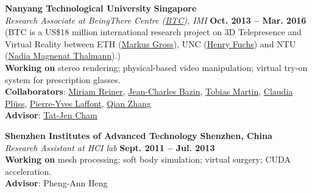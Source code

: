 \documentclass[margin,line]{resume}
\begin{document}
\begin{resume}
    \textbf{Nanyang Technological University} \hfill \textbf{Singapore} \\
    \textsl{Research Associate at BeingThere Centre (\href{https://www.youtube.com/watch?v=Oy-xrxOB_4Q}{BTC}), IMI} \hfill \textbf{Oct. 2013 -- Mar. 2016}\\
    (BTC is a US\$18 million international research project on 3D Telepresence and Virtual Reality between ETH (\href{https://en.wikipedia.org/wiki/Markus_Gross}{Markus Gross}), UNC (\href{https://en.wikipedia.org/wiki/Henry_Fuchs}{Henry Fuchs}) and
    NTU (\href{https://en.wikipedia.org/wiki/Nadia_Magnenat_Thalmann}{Nadia Magnenat Thalmann}).)\\
    \textbf{Working on} stereo rendering; physical-based video manipulation; virtual try-on system for prescription glasses. \\
    \textbf{Collaborators}: \href{http://vrneurocog.wixsite.com/vrneurocog}{Miriam Reiner},
    \href{https://scholar.google.com/citations?user=XPZLx-8AAAAJ&hl=en}{Jean-Charles Bazin},
    \href{https://www.virtamed.com/en/about-us/team/tobias-martin-phd/}{Tobias Martin},
    \href{https://www.crunchbase.com/person/claudia-pluss}{Claudia Pl\"{u}ss},
    \href{http://www.py-laffont.info/}{Pierre-Yves Laffont},
    \href{https://qianzhanginfo.github.io/}{Qian Zhang} \\
    \textbf{Advisor}: \href{http://www.ntu.edu.sg/home/astjcham/}{Tat-Jen Cham} 

    \vspace{0.0mm}
    
    \textbf{Shenzhen Institutes of Advanced Technology}   \hfill \textbf{Shenzhen, China} \\
    \textsl{Research Assistant at HCI lab} \hfill \textbf{Sept. 2011 -- Jul. 2013} \\
    \textbf{Working on} mesh processing; soft body simulation; virtual surgery; CUDA acceleration. \\
    \textbf{Advisor}: Pheng-Ann Heng \\




\end{resume}
\end{document}
